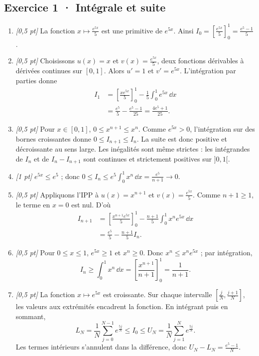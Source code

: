 \subsection*{Exercice 1 · Intégrale et suite}\begin{enumerate}

\item \textit{[0,5 pt]} La fonction $x\mapsto \frac{e^{5x}}{5}$ est une primitive de $e^{5x}$. Ainsi $I_0=[\frac{e^{5x}}{5}]_0^1=\frac{e^{5}-1}{5}$.

\item \textit{[0,5 pt]} Choisissons $u(x)=x$ et $v(x)=\frac{e^{5x}}{5}$, deux fonctions dérivables à dérivées continues sur $[0,1]$. Alors $u'=1$ et $v'=e^{5x}$. L'intégration par parties donne
\[\begin{aligned}I_1&=\left[\frac{xe^{5x}}{5}\right]_0^1-\frac{1}{5}\int_0^1e^{5x}\,\dd x\\&=\frac{e^{5}}{5}-\frac{e^{5}-1}{25}=\frac{4e^{5}+1}{25}.\end{aligned}\]

\item \textit{[0,5 pt]} Pour $x\in[0,1]$, $0\le x^{n+1}\le x^n$. Comme $e^{5x}>0$, l'intégration sur des bornes croissantes donne $0\le I_{n+1}\le I_n$. La suite est donc positive et décroissante au sens large. Les inégalités sont même strictes : les intégrandes de $I_n$ et de $I_n-I_{n+1}$ sont continues et strictement positives sur $]0,1[$.

\item \textit{[1 pt]} $e^{5x}\le e^{5}$ ; donc $0\le I_n\le e^{5}\int_0^1x^n\,\dd x=\frac{e^{5}}{n+1}\to0$.

\item \textit{[0,5 pt]} Appliquons l'IPP à $u(x)=x^{n+1}$ et $v(x)=\frac{e^{5x}}{5}$. Comme $n+1\ge1$, le terme en $x=0$ est nul. D'où
\[\begin{aligned}I_{n+1}&=\left[\frac{x^{n+1}e^{5x}}{5}\right]_0^1-\frac{n+1}{5}\int_0^1x^ne^{5x}\,\dd x\\&=\frac{e^{5}}{5}-\frac{n+1}{5}I_n.\end{aligned}\]

\item \textit{[0,5 pt]} Pour $0\le x\le1$, $e^{5x}\ge1$ et $x^n\ge0$. Donc $x^n\le x^ne^{5x}$ ; par intégration,
\[I_n\ge\int_0^1x^n\,\dd x=\left[\frac{x^{n+1}}{n+1}\right]_0^1=\frac{1}{n+1}.\]

\item \textit{[0,5 pt]} La fonction $x\mapsto e^{5x}$ est croissante. Sur chaque intervalle $[\frac{j}{N},\frac{j+1}{N}]$, les valeurs aux extrémités encadrent la fonction. En intégrant puis en sommant,
\[L_N=\frac{1}{N}\sum_{j=0}^{N-1}e^{\frac{5j}{N}}\le I_0\le U_N=\frac{1}{N}\sum_{j=1}^Ne^{\frac{5j}{N}}.\]
Les termes intérieurs s'annulent dans la différence, donc $U_N-L_N=\frac{e^{5}-1}{N}$.


\end{enumerate}
